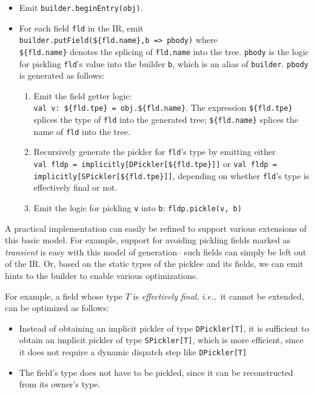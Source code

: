 \documentclass[10pt]{sigplanconf}
\theoremstyle{definition}
\theoremstyle{definition}
\newcommand{\ie}{{\em i.e.,~}}
\newcommand{\term}[1]{\mbox{\texttt{#1}}}
\begin{document}
\begin{itemize}

\item Emit \verb|builder.beginEntry(obj)|.

\item For each field \term{fld} in the IR, emit \\\verb|builder.putField(${fld.name},b => pbody)|
where \\\verb|${fld.name}| denotes the splicing of \term{fld.name}
into the tree. \term{pbody} is the logic for pickling \term{fld}'s value into
the builder \term{b}, which is an alias of \term{builder}. \term{pbody} is generated
as follows:
  \begin{enumerate}

  \item Emit the field getter logic:
  \\\verb|val v: ${fld.tpe} = obj.${fld.name}|. The
  expression \verb|${fld.tpe}| splices the type of \term{fld} into the generated
  tree; \verb|${fld.name}| splices the name of \term{fld} into the tree.

  \item Recursively generate the pickler for \term{fld}'s type by emitting either
  \\\verb|val fldp = implicitly[DPickler[${fld.tpe}]]| or \verb|val fldp = implicitly[SPickler[${fld.tpe}]]|,
  depending on whether \term{fld}'s type is effectively final or not.

  \item Emit the logic for pickling \term{v} into \term{b}: \verb|fldp.pickle(v, b)|
  \end{enumerate}
\end{itemize}

A practical implementation can easily be refined to support various extensions
of this basic model. For example, support for avoiding pickling fields marked
as {\em transient} is easy with this model of generation-- such fields can
simply be left out of the IR. Or, based on the static types of the picklee and
its fields, we can emit hints to the builder to enable various optimizations.

For example, a field whose type $T$ is {\em effectively final}, \ie it cannot
be extended, can be optimized as follows:

\begin{itemize}
\item Instead of obtaining an implicit pickler of type \term{DPickler[T]}, it is
sufficient to obtain an implicit pickler of type \term{SPickler[T]}, which is
more efficient, since it does not require a dynamic dispatch step like
\term{DPickler[T]}

\item The field's type does not have to be pickled, since it can be reconstructed
from its owner's type.
\end{itemize}
\end{document}
